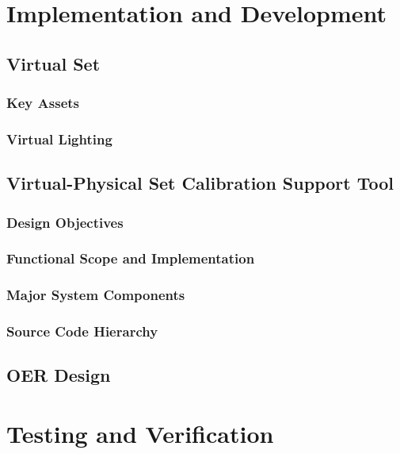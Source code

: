 \documentclass[12pt,a4paper]{report}
\begin{document}
\chapter{Implementation and Development}

\section{Virtual Set}

\subsection{Key Assets}

\subsection{Virtual Lighting}

\section{Virtual-Physical Set Calibration Support Tool}

\subsection{Design Objectives}

\subsection{Functional Scope and Implementation}

\subsection{Major System Components}

\subsection{Source Code Hierarchy}

\section{OER Design}


\chapter{Testing and Verification}
\end{document}
